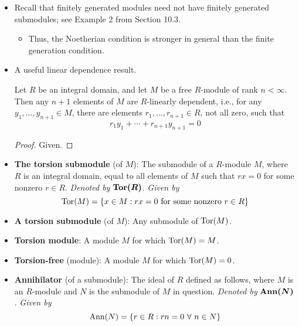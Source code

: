 \documentclass[../notes.tex]{subfiles}
\begin{document}
\begin{itemize}
\begin{corollary}
        \begin{proof}
            Given.
        \end{proof}
    \end{corollary}
    \item Recall that finitely generated modules need not have finitely generated submodules; see Example 2 from Section 10.3.
    \begin{itemize}
        \item Thus, the Noetherian condition is stronger in general than the finite generation condition.
    \end{itemize}
    \item A useful linear dependence result.
    \begin{proposition}\label{prp:12.3}
        Let $R$ be an integral domain, and let $M$ be a free $R$-module of rank $n<\infty$. Then any $n+1$ elements of $M$ are $R$-linearly dependent, i.e., for any $y_1,\dots,y_{n+1}\in M$, there are elements $r_1,\dots,r_{n+1}\in R$, not all zero, such that
        \begin{equation*}
            r_1y_1+\cdots+r_{n+1}y_{n+1} = 0
        \end{equation*}
        \begin{proof}
            Given.
        \end{proof}
    \end{proposition}
    \item \textbf{The torsion submodule} (of $M$): The submodule of a $R$-module $M$, where $R$ is an integral domain, equal to all elements of $M$ such that $rx=0$ for some nonzero $r\in R$. \emph{Denoted by} $\bm{\Tor(R)}$. \emph{Given by}
    \begin{equation*}
        \operatorname{Tor}(M) = \{x\in M:rx=0\text{ for some nonzero }r\in R\}
    \end{equation*}
    \item \textbf{A torsion submodule} (of $M$): Any submodule of $\operatorname{Tor}(M)$.
    \item \textbf{Torsion module}: A module $M$ for which $\operatorname{Tor}(M)=M$.
    \item \textbf{Torsion-free} (module): A module $M$ for which $\operatorname{Tor}(M)=0$.
    \item \textbf{Annihilator} (of a submodule): The ideal of $R$ defined as follows, where $M$ is an $R$-module and $N$ is the submodule of $M$ in question. \emph{Denoted by} $\bm{\Ann(N)}$. \emph{Given by}
    \begin{equation*}
        \Ann(N) = \{r\in R:rn=0\ \forall\ n\in N\}

\end{equation*}
\end{itemize}
\end{document}
